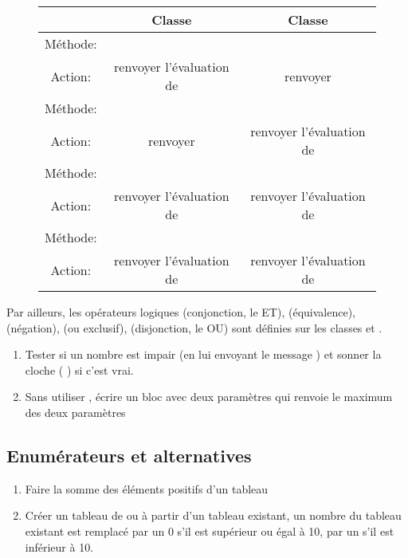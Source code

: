 \begin{figure}[htp]
\small
\begin{center}
\begin{tabular}{|c|c|c|}
\hline
& Classe \ct{True} & Classe \ct{False}\\
\hline
M\'ethode: & \ct{ifTrue: unBloc} &  \ct{ifTrue: unBloc}\\
Action: & renvoyer l'\'evaluation de \ct{unBloc} & renvoyer \ct{nil}\\
\hline
M\'ethode: & \ct{ifFalse: unBloc} & \ct{ifFalse: unBloc}\\
Action: & renvoyer \ct{nil} & renvoyer l'\'evaluation de \ct{unBloc}\\
\hline
M\'ethode: & \ct{ifTrue: unBloc ifFalse: unAutreBloc} & \ct{ifTrue: unBloc ifFalse: unAutreBloc}\\
Action: & renvoyer l'\'evaluation de \ct{unBloc} & renvoyer l'\'evaluation de 
\ct{unAutreBloc}\\
\hline
M\'ethode: & \ct{ifFalse: unBloc ifTrue: unAutreBloc} & \ct{ifFalse: unBloc ifTrue: unAutreBloc}\\
Action: & renvoyer l'\'evaluation de \ct{unAutreBloc} & renvoyer l'\'evaluation de \ct{unBloc}\\
\hline
\end{tabular}
\end{center}
\end{figure}
Par ailleurs, les op\'erateurs logiques \ct{\&} (conjonction, le ET),
 (\'equivalence),  (n\'egation),  (ou exclusif),
\ct{\stBar} (disjonction, le OU) sont d\'efinies sur les classes 
et .

\begin{enumerate}
\item
Tester si un nombre est impair (en lui envoyant le message ) et
sonner la cloche ( ) si c'est vrai.
\item
Sans utiliser , \'ecrire un bloc avec deux param\`etres qui renvoie
le maximum des deux param\`etres
\end{enumerate}

\subsection{Enum\'erateurs et alternatives}
\begin{enumerate}
\item
Faire la somme des \'el\'ements positifs d'un tableau
\item
Cr\'eer un tableau de  ou  \`a partir d'un tableau existant, un nombre  du tableau existant est remplac\'e par un 0 s'il est sup\'erieur
ou \'egal \`a 10, par un  s'il est inf\'erieur \`a 10.
\end{enumerate}

